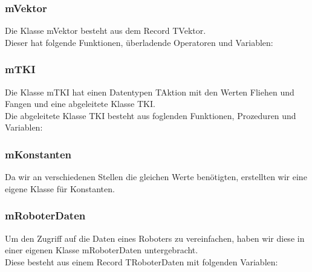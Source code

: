 \subsubsection{mVektor}
Die Klasse mVektor besteht aus dem Record TVektor.
\\
Dieser hat folgende Funktionen, überladende Operatoren und Variablen:


\subsubsection{mTKI}
Die Klasse mTKI hat einen Datentypen TAktion mit den Werten Fliehen und Fangen und eine abgeleitete Klasse TKI.
\\
Die abgeleitete Klasse TKI besteht aus foglenden Funktionen, Prozeduren und Variablen:\\


\subsubsection{mKonstanten}
Da wir an verschiedenen Stellen die gleichen Werte benötigten, erstellten wir eine eigene Klasse für Konstanten.


\subsubsection{mRoboterDaten}
Um den Zugriff auf die Daten eines Roboters zu vereinfachen, haben wir diese in einer eigenen Klasse mRoboterDaten untergebracht.
\\
Diese besteht aus einem Record TRoboterDaten mit folgenden Variablen:




